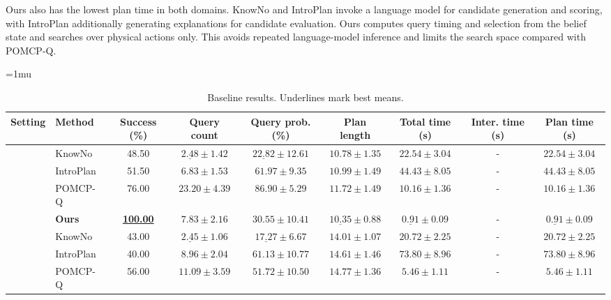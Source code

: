 Ours also has the lowest plan time in both domains. KnowNo and IntroPlan invoke a language model for candidate generation and scoring, with IntroPlan additionally generating explanations for candidate evaluation. Ours computes query timing and selection from the belief state and searches over physical actions only. This avoids repeated language-model inference and limits the search space compared with POMCP-Q.



\begin{table}[t]
\centering
\caption{Baseline results. Underlines mark best means.}
\label{tab:baseline_results}
\footnotesize
\setlength{\tabcolsep}{2pt}
\renewcommand{\arraystretch}{1.05}
\setlength{\extrarowheight}{0pt}
\medmuskip=1mu\relax
\begin{tabular*}{\textwidth}{@{\extracolsep{\fill}}llccccccc@{}}
\toprule
Setting & Method & Success (\%) & Query count & Query prob.(\%) & Plan length & Total time (s) & Inter. time (s) & Plan time (s)\\
\midrule
{} & KnowNo & 48.50 & $\underline{2.48} \pm 1.42$ & $\underline{22.82} \pm 12.61$ & $10.78 \pm 1.35$ & $22.54 \pm 3.04$ & - & $22.54 \pm 3.04$ \\
 & IntroPlan & 51.50 & $6.83 \pm 1.53$ & $61.97 \pm 9.35$ & $10.99 \pm 1.49$ & $44.43 \pm 8.05$ & - & $44.43 \pm 8.05$ \\
 & POMCP-Q & 76.00 & $23.20 \pm 4.39$ & $86.90 \pm 5.29$ & $11.72 \pm 1.49$ & $10.16 \pm 1.36$ & - & $10.16 \pm 1.36$ \\
 & \textbf{Ours} & \textbf{\underline{100.00}} & $\boldsymbol{7.83 \pm 2.16}$ & $\boldsymbol{30.55 \pm 10.41}$ & $\boldsymbol{\underline{10.35} \pm 0.88}$ & $\boldsymbol{\underline{0.91} \pm 0.09}$ & - & $\boldsymbol{\underline{0.91} \pm 0.09}$ \\
\addlinespace[3pt]
 & KnowNo & 43.00 & $\underline{2.45} \pm 1.06$ & $\underline{17.27} \pm 6.67$ & $14.01 \pm 1.07$ & $20.72 \pm 2.25$ & - & $20.72 \pm 2.25$ \\
 & IntroPlan & 40.00 & $8.96 \pm 2.04$ & $61.13 \pm 10.77$ & $14.61 \pm 1.46$ & $73.80 \pm 8.96$ & - & $73.80 \pm 8.96$ \\
 & POMCP-Q & 56.00 & $11.09 \pm 3.59$ & $51.72 \pm 10.50$ & $14.77 \pm 1.36$ & $5.46 \pm 1.11$ & - & $5.46 \pm 1.11$ \\

\end{tabular*}
\end{table}
